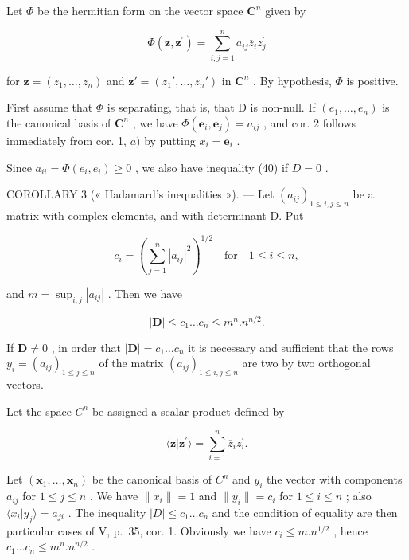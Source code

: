 Let \(\Phi\) be the hermitian form on the vector space \(\mathbf{C}^n\) given by

\[
\Phi (\mathbf {z}, \mathbf {z} ^ {\prime}) = \sum_ {i, j = 1} ^ {n} a _ {i j} \overline {{{{z}}}} _ {i} z _ {j} ^ {\prime}
\]

for \(\mathbf{z} = (z_1, \dots, z_n)\) and \(\mathbf{z}' = (z_1', \dots, z_n')\) in \(\mathbf{C}^n\) . By hypothesis, \(\Phi\) is positive.

First assume that \(\Phi\) is separating, that is, that D is non-null. If \((e_1, \ldots, e_n)\) is the canonical basis of \(\mathbf{C}^n\) , we have \(\Phi(\mathbf{e}_i, \mathbf{e}_j) = a_{ij}\) , and cor. 2 follows immediately from cor. 1, \(a)\) by putting \(x_i = \mathbf{e}_i\) .

Since \(a_{ii} = \Phi(e_i, e_i) \geqslant 0\) , we also have inequality (40) if \(D = 0\) .

COROLLARY 3 (« Hadamard's inequalities »). --- Let \((a_{ij})_{1 \leqslant i,j \leqslant n}\) be a matrix with complex elements, and with determinant D. Put

\[
c _ {i} = \left(\sum_ {j = 1} ^ {n} | a _ {i j} | ^ {2}\right) ^ {1 / 2} \quad \text {for} \quad 1 \leqslant i \leqslant n,
\]

and \(m = \sup_{i,j}|a_{ij}|\) . Then we have

\[
| \mathbf {D} | \leqslant c _ {1} \dots c _ {n} \leqslant m ^ {n}. n ^ {n / 2}.\tag{41}
\]

If \(\mathbf{D} \neq 0\) , in order that \(|\mathbf{D}| = c_1 \ldots c_n\) it is necessary and sufficient that the rows \(y_i = (a_{ij})_{1 \leqslant j \leqslant n}\) of the matrix \((a_{ij})_{1 \leqslant i,j \leqslant n}\) are two by two orthogonal vectors.

Let the space \(C^{n}\) be assigned a scalar product defined by

\[
\langle \mathbf {z} | \mathbf {z} ^ {\prime} \rangle = \sum_ {i = 1} ^ {n} \overline {{z}} _ {i} z _ {i} ^ {\prime}.
\]

Let \((\mathbf{x}_{1},\ldots,\mathbf{x}_{n})\) be the canonical basis of \(C^{n}\) and \(y_{i}\) the vector with components \(a_{ij}\) for \(1\leqslant j\leqslant n\) . We have \(\|x_{i}\|=1\) and \(\|y_{i}\|=c_{i}\) for \(1\leqslant i\leqslant n\) ; also \(\langle x_{i}|y_{j}\rangle=a_{ji}\) . The inequality \(|D|\leqslant c_{1}\ldots c_{n}\) and the condition of equality are then particular cases of V, p.~35, cor. 1. Obviously we have \(c_{i}\leqslant m.n^{1/2}\) , hence \(c_{1}\ldots c_{n}\leqslant m^{n}.n^{n/2}\) .

